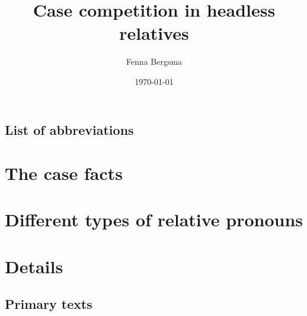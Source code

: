\documentclass[11pt,hidelinks]{memoir}
\title{Case competition in headless relatives}
\author{Fenna Bergsma}
\date{\today}
\begin{document}

\begin{titlingpage}
  \maketitle
\end{titlingpage}


\frontmatter
\clearpage
\tableofcontents

\clearpage
\listoftables

\chapter*{List of abbreviations}
\begingroup
  \setlength{\LTleft}{-\tabcolsep}
\printacronyms[include-classes=abbr, heading=none]
\endgroup
{}


\mainmatter
\setcounter{secnumdepth}{4}



\part{The case facts}\label{part:complexity}



\part{Different types of relative pronouns}\label{part:direction}




\part{Details}\label{part:details}





\backmatter



\clearpage
\chapter*{Primary texts}
\begingroup
  \setlength{\LTleft}{-\tabcolsep}
\printacronyms[include-classes=texts, heading=none]
\endgroup
{}

\newrefcontext[sorting=nyt]
\printbibliography

\end{document}
